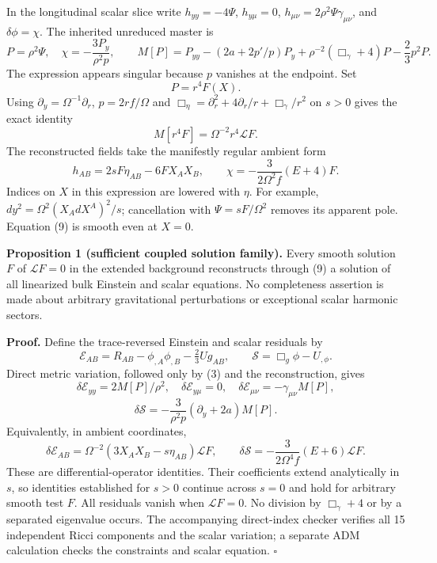 \documentclass[
  10pt,
]{article}
\begin{document}
In the longitudinal scalar slice write \(h_{yy}=-4\Psi\),
\(h_{y\mu}=0\), \(h_{\mu\nu}=2\rho^2\Psi\gamma_{\mu\nu}\), and
\(\delta\phi=\chi\). The inherited unreduced master is \[
 P=\rho^2\Psi,\quad\chi=-\frac{3P_y}{\rho^2p},\qquad
 M[P]=P_{yy}-(2a+2p'/p)P_y+
 \rho^{-2}(\Box_\gamma+4)P-\frac23p^2P.                         \tag{6}
\] The expression appears singular because \(p\) vanishes at the
endpoint. Set \[
                         P=r^4F(X).                           \tag{7}
\] Using \(\partial_y=\Omega^{-1}\partial_r\), \(p=2rf/\Omega\) and
\(\Box_\eta=\partial_r^2+4\partial_r/r+\Box_\gamma/r^2\) on \(s>0\)
gives the exact identity \[
                   M[r^4F]=\Omega^{-2}r^4\mathcal LF.            \tag{8}
\] The reconstructed fields take the manifestly regular ambient form \[
 \boxed{h_{AB}=2sF\eta_{AB}-6F X_AX_B,\qquad
 \chi=-\frac{3}{2\Omega^2f}(E+4)F.}                            \tag{9}
\] Indices on \(X\) in this expression are lowered with \(\eta\). For
example, \(dy^2=\Omega^2(X_A dX^A)^2/s\); cancellation with
\(\Psi=sF/\Omega^2\) removes its apparent pole. Equation (9) is smooth
even at \(X=0\).

\textbf{Proposition 1 (sufficient coupled solution family).} Every
smooth solution \(F\) of \(\mathcal LF=0\) in the extended background
reconstructs through (9) a solution of all linearized bulk Einstein and
scalar equations. No completeness assertion is made about arbitrary
gravitational perturbations or exceptional scalar harmonic sectors.

\textbf{Proof.} Define the trace-reversed Einstein and scalar residuals
by \[
 \mathscr E_{AB}=R_{AB}-\phi_{,A}\phi_{,B}-\tfrac23Ug_{AB},
 \qquad\mathscr S=\Box_g\phi-U_{,\phi}.
\] Direct metric variation, followed only by (3) and the reconstruction,
gives \[
 \delta\mathscr E_{yy}=2M[P]/\rho^2,\quad
 \delta\mathscr E_{y\mu}=0,\quad
 \delta\mathscr E_{\mu\nu}=-\gamma_{\mu\nu}M[P],
\] \[
 \delta\mathscr S=-\frac3{\rho^2p}(\partial_y+2a)M[P].           \tag{10}
\] Equivalently, in ambient coordinates, \[
 \boxed{\delta\mathscr E_{AB}=
 \Omega^{-2}(3X_AX_B-s\eta_{AB})\mathcal LF,\qquad
 \delta\mathscr S=-\frac3{2\Omega^4 f}(E+6)\mathcal LF.}          \tag{11}
\] These are differential-operator identities. Their coefficients extend
analytically in \(s\), so identities established for \(s>0\) continue
across \(s=0\) and hold for arbitrary smooth test \(F\). All residuals
vanish when \(\mathcal LF=0\). No division by \(\Box_\gamma+4\) or by a
separated eigenvalue occurs. The accompanying direct-index checker
verifies all 15 independent Ricci components and the scalar variation; a
separate ADM calculation checks the constraints and scalar equation.
\(\square\)
\end{document}
